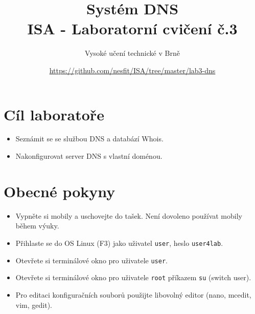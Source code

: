 \documentclass[a4paper,11pt]{article}
\title{Systém DNS\\
{\bf\large ISA - Laboratorní cvičení č.3}}
\author{Vysoké učení technické v Brně}
\date{\url{https://github.com/nesfit/ISA/tree/master/lab3-dns}}
\begin{document}
{\let\newpage\relax\maketitle}

\section*{Cíl laboratoře}
\begin{itemize}
  \item Seznámit se se službou DNS a databází Whois.
  \item Nakonfigurovat server DNS s vlastní doménou. 
\end{itemize}

\section*{Obecné pokyny}
\begin{itemize}
  \item Vypněte si mobily a uschovejte do tašek. Není dovoleno používat mobily během výuky. 
  \item Přihlaste se do OS Linux (F3) jako uživatel {\tt user}, heslo {\tt user4lab}.
  \item Otevřete si terminálové okno pro uživatele {\tt user}.
  \item Otevřete si terminálové okno pro uživatele {\tt root} příkazem {\tt su}
    (switch user).
  \item Pro editaci konfiguračních souborů použijte libovolný editor (nano, mcedit, vim, gedit).
\end{itemize}
\end{document}
